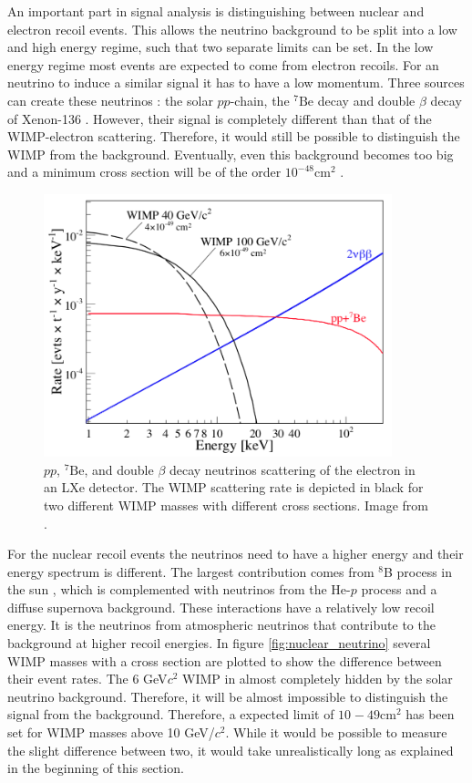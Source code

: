 \documentclass{article}
\begin{document}
An important part in signal analysis is distinguishing between nuclear and electron recoil events. This allows the neutrino background to be split into a low and high energy regime, such that two separate limits can be set. 
In the low energy regime most events are expected to come from electron recoils. For an neutrino to induce a similar signal it has to have a low momentum. Three sources can create these neutrinos \cite{Baudis:2013qla}: the solar $pp$-chain, the ${}^7\text{Be}$ decay and double $\beta$ decay of Xenon-136 \cite{Albert:2015eem}. However, their signal is completely different than that of the WIMP-electron scattering. Therefore, it would still be possible to distinguish the WIMP from the background. Eventually, even this background becomes too big and a minimum cross section will be of the order $10^{-48}$cm$^2$ \cite{Schumann:2015cpa}.

\begin{figure}[h!]
    \centering
    \includegraphics[width=0.9\textwidth]{Electron_neutrino.png}
    \caption{$pp$, ${}^7\text{Be}$, and double $\beta$ decay neutrinos scattering of the electron in an LXe detector. The WIMP scattering rate is depicted in black for two different WIMP masses with different cross sections. Image from \cite{Baudis:2013qla}.}
    \label{fig:electron_neutrino}
\end{figure}


For the nuclear recoil events the neutrinos need to have a higher energy and their energy spectrum is different. The largest contribution comes from $^8$B process in the sun \cite{Strigari:2009bq}, which is complemented with neutrinos from the He-$p$ process and a diffuse supernova background. These interactions have a relatively low recoil energy. It is the neutrinos from atmospheric neutrinos that contribute to the background at higher recoil energies. In figure \ref{fig:nuclear_neutrino} several WIMP masses with a cross section are plotted to show the difference between their event rates. The 6 GeV$c^2$ WIMP in almost completely hidden by the solar neutrino background. Therefore, it will be almost impossible to distinguish the signal from the background. Therefore, a expected limit of $10^{}-49$cm$^2$ has been set for WIMP masses above 10 GeV/$c^2$. While it would be possible to measure the slight difference between two, it would take unrealistically long as explained in the beginning of this section. 
\end{document}
